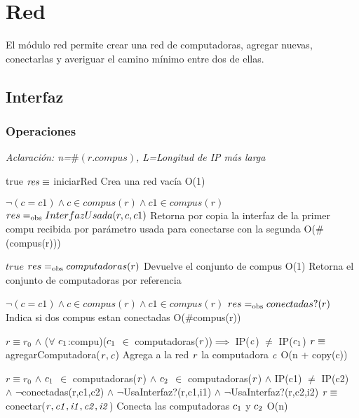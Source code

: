 \section{Red}
El módulo red permite crear una red de computadoras, agregar nuevas, conectarlas y averiguar el camino mínimo entre dos de ellas.


\subsection{Interfaz}


\subsubsection*{Operaciones}

\textit{Aclaración: n=$\# (r.compus)$, L=Longitud de IP más larga}

 {true}
 {$\text{\textit{res}} \equiv$ iniciarRed}
 {Crea una red vacía}
 {O(1)}

{$\neg(c = c1) \land c \in compus(r) \land c1 \in compus(r)$}
{$res =_{\mathrm{obs}} InterfazUsada(r,c,c1)$}
{Retorna por copia la interfaz de la primer compu recibida por parámetro usada para conectarse con la segunda}
{O($\#$(compus(r)))}

{$true$}
{$res =_{\mathrm{obs}} computadoras(r)$}
{Devuelve el conjunto de compus}
{O(1)}
{Retorna el conjunto de computadoras por referencia}

{$\neg(c = c1) \land c \in compus(r) \land c1 \in compus(r)$}
{$res =_{\mathrm{obs}} conectadas?(r)$}
{Indica si dos compus estan conectadas}
{O($\#$compus(r))}
{}

 {$r \equiv r_0$ $\land$ ($\forall$ $\text{\textit{$c_{1}$}}$:compu)($\text{\textit{$c_{1}$}}$ $\in$ computadoras($\text{\textit{r}}$))$\implies$ IP($\text{\textit{c}}$) $\neq$ IP($\text{\textit{$c_{1}$}}$)}
 {$\text{\textit{r}} \equiv$ agregarComputadora($\text{\textit{r}},\text{\textit{c}}$)}
 {Agrega a la red $\text{\textit{r}}$ la computadora $\text{\textit{c}}$}
 {O(n + copy(c))}

 {$r \equiv r_0$ $\land$ $\text{\textit{$c_{1}$}}$ $\in$ computadoras($\text{\textit{r}}$) $\land$ $\text{\textit{$c_{2}$}}$ $\in$ computadoras($\text{\textit{r}}$) $\land$ IP(c1) $\neq$ IP(c2) \\ $\land$ $\neg$conectadas(r,c1,c2) $\land$ $\neg$UsaInterfaz?(r,c1,i1) $\land$ $\neg$UsaInterfaz?(r,c2,i2)}
 {$\text{\textit{r}} \equiv$ conectar($\text{\textit{r}},\text{\textit{c1}},\text{\textit{i1}},\text{\textit{c2}},\text{\textit{i2}}$)}
 {Conecta las computadoras $\text{\textit{$c_{1}$}}$ y $\text{\textit{$c_{2}$}}$}
 {O(n)}

